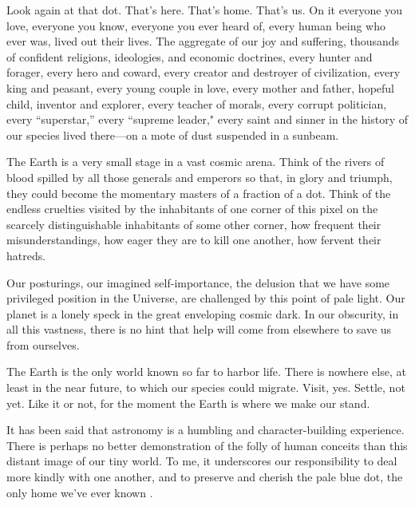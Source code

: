     \begin{displayquote}
        \small %
        \quad Look again at that dot. That's here. That's home. That's us. On it everyone you love, everyone you know, everyone you ever heard of, every human being who ever was, lived out their lives. The aggregate of our joy and suffering, thousands of confident religions, ideologies, and economic doctrines, every hunter and forager, every hero and coward, every creator and destroyer of civilization, every king and peasant, every young couple in love, every mother and father, hopeful child, inventor and explorer, every teacher of morals, every corrupt politician, every ``superstar,'' every ``supreme leader," every saint and sinner in the history of our species lived there---on a mote of dust suspended in a sunbeam.

        \quad The Earth is a very small stage in a vast cosmic arena. Think of the rivers of blood spilled by all those generals and emperors so that, in glory and triumph, they could become the momentary masters of a fraction of a dot. Think of the endless cruelties visited by the inhabitants of one corner of this pixel on the scarcely distinguishable inhabitants of some other corner, how frequent their misunderstandings, how eager they are to kill one another, how fervent their hatreds.

        \quad Our posturings, our imagined self-importance, the delusion that we have some privileged position in the Universe, are challenged by this point of pale light. Our planet is a lonely speck in the great enveloping cosmic dark. In our obscurity, in all this vastness, there is no hint that help will come from elsewhere to save us from ourselves.

        \quad The Earth is the only world known so far to harbor life. There is nowhere else, at least in the near future, to which our species could migrate. Visit, yes. Settle, not yet. Like it or not, for the moment the Earth is where we make our stand.

        \quad It has been said that astronomy is a humbling and character-building experience. There is perhaps no better demonstration of the folly of human conceits than this distant image of our tiny world. To me, it underscores our responsibility to deal more kindly with one another, and to preserve and cherish the pale blue dot, the only home we've ever known \cite{sagan}.
    \end{displayquote}

